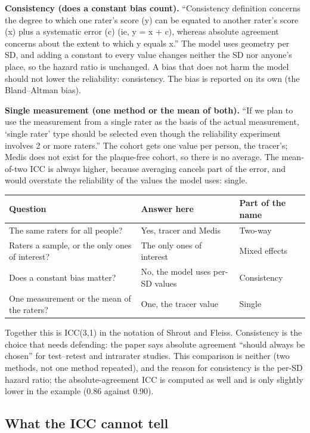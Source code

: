 \documentclass[11pt]{article}
\begin{document}
\textbf{Consistency (does a constant bias count).} ``Consistency definition concerns the degree to which one
rater's score (y) can be equated to another rater's score (x) plus a systematic error (c) (ie, y = x + c), whereas
absolute agreement concerns about the extent to which y equals x.'' The model uses geometry per SD, and adding a
constant to every value changes neither the SD nor anyone's place, so the hazard ratio is unchanged. A bias that
does not harm the model should not lower the reliability: consistency. The bias is reported on its own (the
Bland--Altman bias).

\textbf{Single measurement (one method or the mean of both).} ``If we plan to use the measurement from a single
rater as the basis of the actual measurement, `single rater' type should be selected even though the reliability
experiment involves 2 or more raters.'' The cohort gets one value per person, the tracer's; Medis does not exist
for the plaque-free cohort, so there is no average. The mean-of-two ICC is always higher, because averaging cancels
part of the error, and would overstate the reliability of the values the model uses: single.

\begin{center}
\small
\begin{tabular}{lll}
  \toprule
  Question & Answer here & Part of the name \\
  \midrule
  The same raters for all people? & Yes, tracer and Medis & Two-way \\
  Raters a sample, or the only ones of interest? & The only ones of interest & Mixed effects \\
  Does a constant bias matter? & No, the model uses per-SD values & Consistency \\
  One measurement or the mean of the raters? & One, the tracer value & Single \\
  \bottomrule
\end{tabular}
\end{center}

Together this is ICC(3,1) in the notation of Shrout and Fleiss. Consistency is the choice that needs defending:
the paper says absolute agreement ``should always be chosen'' for test--retest and intrarater studies. This
comparison is neither (two methods, not one method repeated), and the reason for consistency is the per-SD hazard
ratio; the absolute-agreement ICC is computed as well and is only slightly lower in the example (0.86 against 0.90).

\subsection*{What the ICC cannot tell}
\end{document}
